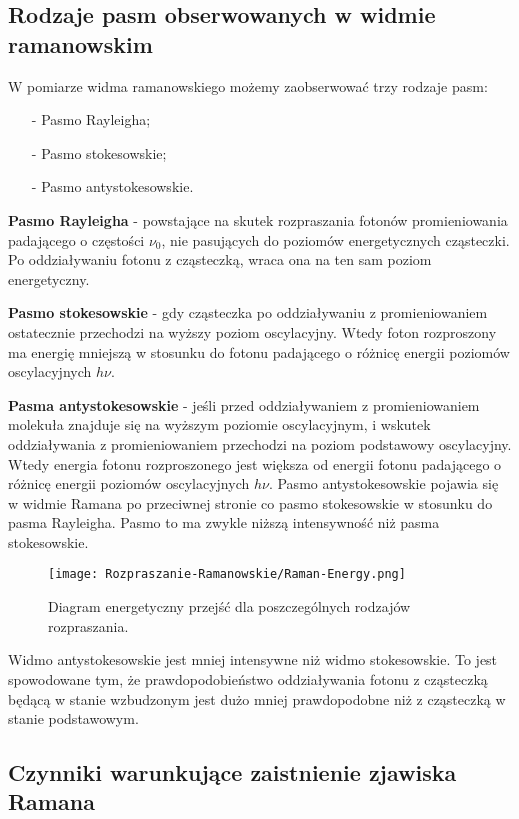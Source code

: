 \subsection{Rodzaje pasm obserwowanych w widmie ramanowskim}
W pomiarze widma ramanowskiego możemy zaobserwować trzy rodzaje pasm:
\begin{itemize}
	\item[-]{Pasmo Rayleigha};
	\item[-]{Pasmo stokesowskie};
	\item[-]{Pasmo antystokesowskie}.
\end{itemize}

\textbf{Pasmo Rayleigha} - powstające na skutek rozpraszania fotonów promieniowania padającego o częstości $\nu_{0}$, nie pasujących do poziomów energetycznych cząsteczki. Po oddziaływaniu fotonu z cząsteczką, wraca ona na ten sam poziom energetyczny.

\textbf{Pasmo stokesowskie} - gdy cząsteczka po oddziaływaniu z promieniowaniem ostatecznie przechodzi na wyższy poziom oscylacyjny. Wtedy foton rozproszony ma energię mniejszą w stosunku do fotonu padającego o różnicę energii poziomów oscylacyjnych $h\nu$.

\textbf{Pasma antystokesowskie} - jeśli przed oddziaływaniem z promieniowaniem molekuła znajduje się na wyższym poziomie oscylacyjnym, i wskutek oddziaływania z promieniowaniem przechodzi na poziom podstawowy oscylacyjny. Wtedy energia fotonu rozproszonego jest większa od energii fotonu padającego o różnicę energii poziomów oscylacyjnych $h\nu$. Pasmo antystokesowskie pojawia się w widmie Ramana po przeciwnej stronie co pasmo stokesowskie w stosunku do pasma Rayleigha. Pasmo to ma zwykle niższą intensywność niż pasma stokesowskie.
\begin{figure}[H]
	\begin{center}
		\texttt{[image: Rozpraszanie-Ramanowskie/Raman-Energy.png]}
		\caption{Diagram energetyczny przejść dla poszczególnych rodzajów rozpraszania.}
	\end{center}
\end{figure}
Widmo antystokesowskie jest mniej intensywne niż widmo stokesowskie. To jest spowodowane tym, że prawdopodobieństwo oddziaływania fotonu z cząsteczką będącą w stanie wzbudzonym jest dużo mniej prawdopodobne niż z cząsteczką w stanie podstawowym.

\subsection{Czynniki warunkujące zaistnienie zjawiska Ramana}
